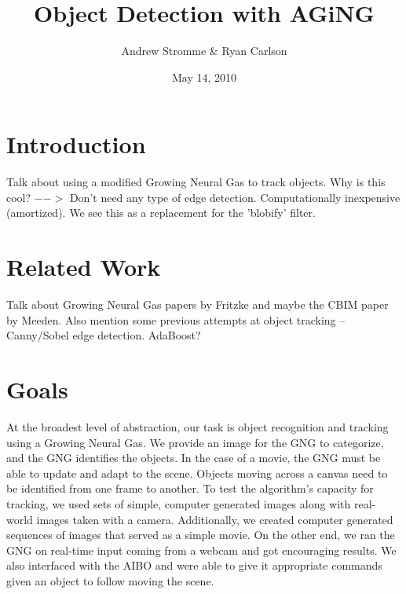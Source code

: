 \documentclass{article}
\renewcommand{\|}{\origbar} %
\begin{document}
\title{Object Detection with AGiNG}
\author{Andrew Stromme \& Ryan Carlson}
\date{May 14, 2010}
\maketitle

\begin{abstract}
\end{abstract}

\section{Introduction}

Talk about using a modified Growing Neural Gas to track objects. Why is this cool? $-->$ Don't need any type of edge detection. Computationally inexpensive (amortized). We see this as a replacement for the 'blobify' filter.

\section{Related Work}

Talk about Growing Neural Gas papers by Fritzke and maybe the CBIM paper by Meeden. Also mention some previous attempts at object tracking -- Canny/Sobel edge detection. AdaBoost?

\section{Goals}

At the broadest level of abstraction, our task is object recognition and tracking using a Growing Neural Gas. We provide an image for the GNG to categorize, and the GNG identifies the objects. In the case of a movie, the GNG must be able to update and adapt to the scene. Objects moving across a canvas need to be identified from one frame to another. To test the algorithm's capacity for tracking, we used sets of simple, computer generated images along with real-world images taken with a camera. Additionally, we created computer generated sequences of images that served as a simple movie. On the other end, we ran the GNG on real-time input coming from a webcam and got encouraging results. We also interfaced with the AIBO and were able to give it appropriate commands given an object to follow moving the scene.
\end{document}

